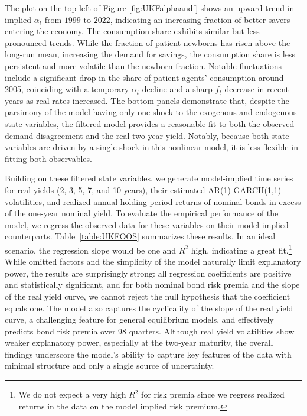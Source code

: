\documentclass[preprint,11pt,authoryear]{elsarticle}
\theoremstyle{plain}
\begin{document}
%
The plot on the top left of Figure \ref{fig:UKFalphaandf} shows an upward trend in implied $\alpha_t$ from $1999$ to $2022$, indicating an increasing fraction of better savers entering the economy. The consumption share exhibits similar but less pronounced trends. While the fraction of patient newborns has risen above the long-run mean, increasing the demand for savings, the consumption share is less persistent and more volatile than the newborn fraction. Notable fluctuations include a significant drop in the share of patient agents' consumption around 2005, coinciding with a temporary $\alpha_t$ decline and a sharp $f_t$ decrease in recent years as real rates increased. The bottom panels demonstrate that, despite the parsimony of the model having only one shock to the exogenous and endogenous state variables, the filtered model provides a reasonable fit to both the observed demand disagreement and the real two-year yield. Notably, because both state variables are driven by a single shock in this nonlinear model, it is less flexible in fitting both observables.

Building on these filtered state variables, we generate model-implied time series for real yields (2, 3, 5, 7, and 10 years), their estimated AR(1)-GARCH(1,1) volatilities, and realized annual holding period returns of nominal bonds in excess of the one-year nominal yield. To evaluate the empirical performance of the model, we regress the observed data for these variables on their model-implied counterparts. Table~\ref{table:UKFOOS} summarizes these results. In an ideal scenario, the regression slope would be one and $R^2$ high, indicating a great fit.\footnote{We do not expect a very high $R^2$ for risk premia since we regress realized returns in the data on the model implied risk premium.} While omitted factors and the simplicity of the model naturally limit explanatory power, the results are surprisingly strong: all regression coefficients are positive and statistically significant, and for both nominal bond risk premia and the slope of the real yield curve, we cannot reject the null hypothesis that the coefficient equals one. The model also captures the cyclicality of the slope of the real yield curve, a challenging feature for general equilibrium models, and effectively predicts bond risk premia over 98 quarters. Although real yield volatilities show weaker explanatory power, especially at the two-year maturity, the overall findings underscore the model's ability to capture key features of the data with minimal structure and only a single source of uncertainty.
\end{document}
